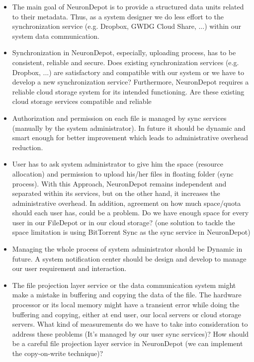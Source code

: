\documentclass{frontiersSCNS} %
\begin{document}
\begin{itemize}
\item The main goal of NeuronDepot is to provide a structured data units
related to their metadata. Thus, as a system designer we do less effort to the
synchronization service (e.g. Dropbox, GWDG Cloud Share, ...) within our system
data communication.
\item Synchronization in NeuronDepot, especially, uploading process, has to be
consistent, reliable and secure. Does existing synchronization services (e.g.
Dropbox, ...) are satisfactory and compatible with our system or we have to
develop a new synchronization service? Furthermore, NeuronDepot requires a
reliable cloud storage system for its intended functioning. Are these existing
cloud storage services compatible and reliable ~\cite{Borgmann2012}
\item Authorization and permission on each file is managed by sync services
(manually by the system administrator). In future it should be dynamic and
smart enough for better improvement which leads to administrative overhead
reduction.
\item User has to ask system administrator to give him the space (resource
allocation) and permission to upload his/her files in floating folder (sync
process). With this Approach, NeuronDepot remains independent and separated
within its services, but on the other hand, it increases the administrative
overhead. In addition, agreement on how much space/quota should each user has,
could be a problem. Do we have enough space for every user in our FileDepot or
in our cloud storage? (one solution to tackle the space limitation is using
BitTorrent Sync as the sync service in NeuronDepot)
\item Managing the whole process of system administrator should be Dynamic in
future. A system notification center should be design and develop to manage our
user requirement and interaction.
\item The file projection layer service or the data communication system might
make a mistake in buffering and copying the data of the file. The hardware
processor or its local memory might have a transient error while doing the
buffering and copying, either at end user, our local servers or cloud storage
servers. What kind of measurements do we have to take into consideration to
address these problems (It's managed by our user sync services)? How should be
a careful file projection layer service in NeuronDepot (we can implement the
copy-on-write technique)?
\end{itemize}
\end{document}
